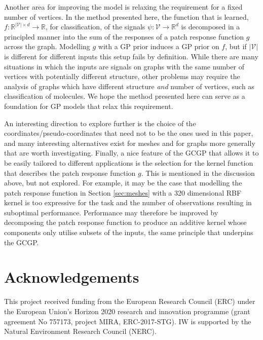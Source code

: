 \documentclass{article}
\begin{document}
Another area for improving the model is relaxing the requirement for a fixed number of vertices. In the method presented here, the function that is learned, $f: \mathbb{R}^{\lvert\mathcal{V}\rvert\times d} \to \mathbb{R}$, for classification, of the signals $\psi: \mathcal{V}\to \mathbb{R}^d$ is decomposed in a principled manner into the sum of the responses of a patch response function $g$ across the graph. Modelling $g$ with a GP prior induces a GP prior on $f$, but if $\lvert \mathcal{V} \rvert$ is different for different inputs this setup fails by definition. While there are many situations in which the inputs are signals on graphs with the same number of vertices with potentially different structure, other problems may require the analysis of graphs which have different structure \emph{and} number of vertices, such as classification of molecules. We hope the method presented here can serve as a foundation for GP models that relax this requirement. 

An interesting direction to explore further is the choice of the coordinates/pseudo-coordinates that need not to be the ones used in this paper, and many interesting alternatives exist for meshes and for graphs more generally that are worth investigating. Finally, a nice feature of the GCGP that allows it to be easily tailored to different applications is the selection for the kernel function that describes the patch response function $g$. This is mentioned in the discussion above, but not explored. For example, it may be the case that modelling the patch response function in Section \ref{sec:meshes} with a 320 dimensional RBF kernel is too expressive for the task and the number of observations resulting in suboptimal performance. Performance may therefore be improved by decomposing the patch response function to produce an additive kernel whose components only utilise subsets of the inputs, the same principle that underpins the GCGP.

\section*{Acknowledgements}
This project received funding from the European Research Council (ERC) under the European Union's Horizon 2020 research and innovation programme (grant agreement No 757173, project MIRA, ERC-2017-STG). IW is supported by the Natural Environment Research Council (NERC).





\end{document}
